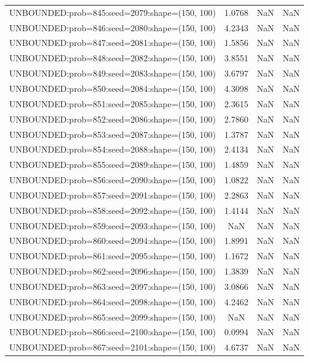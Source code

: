 \begin{longtable}{lccc}
UNBOUNDED:prob=845:seed=2079:shape=(150, 100) &  1.0768 &   NaN &    NaN \\
UNBOUNDED:prob=846:seed=2080:shape=(150, 100) &  4.2343 &   NaN &    NaN \\
UNBOUNDED:prob=847:seed=2081:shape=(150, 100) &  1.5856 &   NaN &    NaN \\
UNBOUNDED:prob=848:seed=2082:shape=(150, 100) &  3.8551 &   NaN &    NaN \\
UNBOUNDED:prob=849:seed=2083:shape=(150, 100) &  3.6797 &   NaN &    NaN \\
UNBOUNDED:prob=850:seed=2084:shape=(150, 100) &  4.3098 &   NaN &    NaN \\
UNBOUNDED:prob=851:seed=2085:shape=(150, 100) &  2.3615 &   NaN &    NaN \\
UNBOUNDED:prob=852:seed=2086:shape=(150, 100) &  2.7860 &   NaN &    NaN \\
UNBOUNDED:prob=853:seed=2087:shape=(150, 100) &  1.3787 &   NaN &    NaN \\
UNBOUNDED:prob=854:seed=2088:shape=(150, 100) &  2.4134 &   NaN &    NaN \\
UNBOUNDED:prob=855:seed=2089:shape=(150, 100) &  1.4859 &   NaN &    NaN \\
UNBOUNDED:prob=856:seed=2090:shape=(150, 100) &  1.0822 &   NaN &    NaN \\
UNBOUNDED:prob=857:seed=2091:shape=(150, 100) &  2.2863 &   NaN &    NaN \\
UNBOUNDED:prob=858:seed=2092:shape=(150, 100) &  1.4144 &   NaN &    NaN \\
UNBOUNDED:prob=859:seed=2093:shape=(150, 100) &     NaN &   NaN &    NaN \\
UNBOUNDED:prob=860:seed=2094:shape=(150, 100) &  1.8991 &   NaN &    NaN \\
UNBOUNDED:prob=861:seed=2095:shape=(150, 100) &  1.1672 &   NaN &    NaN \\
UNBOUNDED:prob=862:seed=2096:shape=(150, 100) &  1.3839 &   NaN &    NaN \\
UNBOUNDED:prob=863:seed=2097:shape=(150, 100) &  3.0866 &   NaN &    NaN \\
UNBOUNDED:prob=864:seed=2098:shape=(150, 100) &  4.2462 &   NaN &    NaN \\
UNBOUNDED:prob=865:seed=2099:shape=(150, 100) &     NaN &   NaN &    NaN \\
UNBOUNDED:prob=866:seed=2100:shape=(150, 100) &  0.0994 &   NaN &    NaN \\
UNBOUNDED:prob=867:seed=2101:shape=(150, 100) &  4.6737 &   NaN &    NaN \\

\end{longtable}
